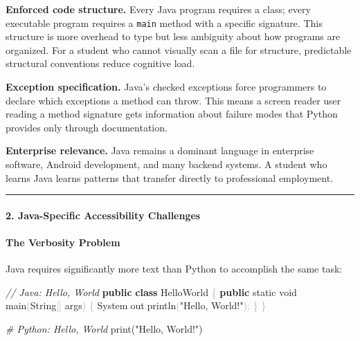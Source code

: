 \documentclass[
  justified,
  openright,
]{tufte-book}
\let\subsection\paragraph
\let\paragraph\paragraph
\newcommand{\KeywordTok}[1]{\textcolor{CodeKeyword}{\textbf{#1}}}  %
\newcommand{\StringTok}[1]{\textcolor{CodeString}{#1}}              %
\newcommand{\CommentTok}[1]{\textcolor{CodeComment}{\textit{#1}}}  %
\newcommand{\CodeFuncTok}[1]{\textcolor{CodeKeyword}{#1}}           %
\newcommand{\CodeTypeTok}[1]{\textcolor{CodeType}{#1}}              %
\newcommand{\OperatorTok}[1]{\textcolor{DarkGray}{#1}}              %
\newenvironment{Shaded}{%
  \begin{mdframed}[style=TufteCode]%
}{%
  \end{mdframed}%
}
\let\subsection\paragraph
\let\paragraph\paragraph
\begin{document}
\textbf{Enforced code structure.} Every Java program requires a class;
every executable program requires a \texttt{main} method with a specific
signature. This structure is more overhead to type but less ambiguity
about how programs are organized. For a student who cannot visually scan
a file for structure, predictable structural conventions reduce
cognitive load.

\textbf{Exception specification.} Java's checked exceptions force
programmers to declare which exceptions a method can throw. This means a
screen reader user reading a method signature gets information about
failure modes that Python provides only through documentation.

\textbf{Enterprise relevance.} Java remains a dominant language in
enterprise software, Android development, and many backend systems. A
student who learns Java learns patterns that transfer directly to
professional employment.

\begin{center}\rule{0.5\linewidth}{0.5pt}\end{center}

\subsection{2. Java-Specific Accessibility
Challenges}\label{java-specific-accessibility-challenges}

\subsection{The Verbosity Problem}\label{the-verbosity-problem}

Java requires significantly more text than Python to accomplish the same
task:

\begin{Shaded}
\begin{Highlighting}[]
\CommentTok{// Java: Hello, World}
\KeywordTok{public} \KeywordTok{class} HelloWorld \OperatorTok{\{}
    \KeywordTok{public} \CodeTypeTok{static} \CodeTypeTok{void} \CodeFuncTok{main}\OperatorTok{(}String\OperatorTok{[]} args\OperatorTok{)} \OperatorTok{\{}
        System\OperatorTok{.}\CodeFuncTok{out}\OperatorTok{.}\CodeFuncTok{println}\OperatorTok{(}\StringTok{"Hello, World!"}\OperatorTok{);}
    \OperatorTok{\}}
\OperatorTok{\}}
\end{Highlighting}
\end{Shaded}

\begin{Shaded}
\begin{Highlighting}[]
\CommentTok{\# Python: Hello, World}
print(\StringTok{"Hello, World!"})
\end{Highlighting}
\end{Shaded}
\end{document}
